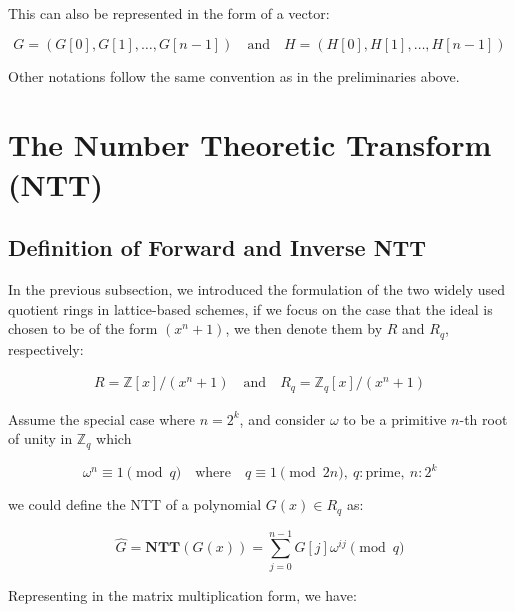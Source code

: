 \documentclass[12pt]{article}
\begin{document}
This can also be represented in the form of a vector:

\begin{equation*}
    G = (G[0], G[1], \ldots, G[n - 1]) \quad \text{and} \quad H = (H[0], H[1], \ldots, H[n - 1])
\end{equation*}

Other notations follow the same convention as in the preliminaries above.

\section{The Number Theoretic Transform (NTT)}

\subsection{Definition of Forward and Inverse NTT}

In the previous subsection, 
we introduced the formulation of the two widely used quotient rings in lattice-based schemes, 
if we focus on the case that the ideal is chosen to be of the form $(x^n + 1)$, 
we then denote them by $R$ and $R_q$, respectively:

\begin{align*}
    R = \mathbb{Z}[x] / (x^n + 1) \quad \text{and} \quad R_q = \mathbb{Z}_q[x] / (x^n + 1)
\end{align*}

Assume the special case where $n = 2^k$, 
and consider $\omega$ to be a primitive $n$-th root of unity in $\mathbb{Z}_q$
which

\begin{equation*}
    \omega^n \equiv 1 \pmod{q} \quad \text{where} \quad q \equiv 1 \pmod{2n}, \ q: \text{prime}, \ n: 2^k 
\end{equation*}

we could define the NTT of a polynomial $G(x) \in R_q$ as:

\begin{equation*}
    \hat{G} = \mathbf{NTT}(G(x)) = \sum_{j = 0}^{n - 1} G[j] \omega^{i j} \pmod{q}
\end{equation*}

Representing in the matrix multiplication form, we have:
\end{document}
